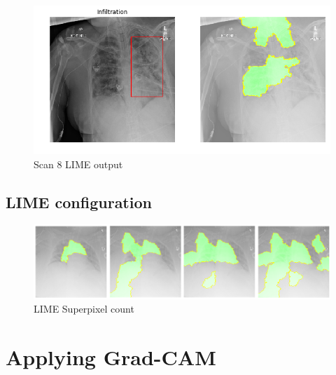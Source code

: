 \begin{figure}[h]
\centering
\caption{Scan 8 LIME output}
\includegraphics[width=12cm]{chapters/03_classification/images/lime_8.png}
\end{figure}

\subsection{LIME configuration}

\begin{figure}[h]
\centering
\caption{LIME Superpixel count}
\includegraphics[width=12cm]{chapters/03_classification/images/lime-superpixel.png}
\end{figure}

\section{Applying Grad-CAM}
